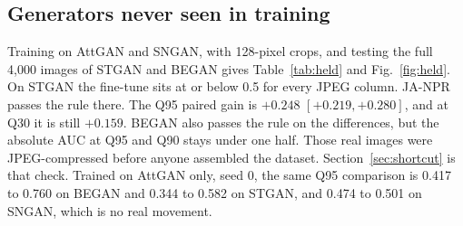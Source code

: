 \documentclass[conference]{IEEEtran}
\begin{document}
\begin{table}[t]
\centering
\caption{Ablation and controls on AttGAN (seed 0, AUC, 4:2:0). All rows: same data and protocol.
Rows come from three runs of the same seed; arms repeated across runs differ by at most 0.006.}
\label{tab:abl}
\setlength{\tabcolsep}{3pt}
\end{table}

\subsection{Generators never seen in training}
Training on AttGAN and SNGAN, with 128-pixel crops, and testing the full 4{,}000 images of STGAN and BEGAN gives Table~\ref{tab:held} and Fig.~\ref{fig:held}. On STGAN the fine-tune sits at or below 0.5 for every JPEG column. JA-NPR passes the rule there. The Q95 paired gain is $+0.248$ $[+0.219,+0.280]$, and at Q30 it is still $+0.159$. BEGAN also passes the rule on the differences, but the absolute AUC at Q95 and Q90 stays under one half. Those real images were JPEG-compressed before anyone assembled the dataset. Section~\ref{sec:shortcut} is that check. Trained on AttGAN only, seed 0, the same Q95 comparison is 0.417 to 0.760 on BEGAN and 0.344 to 0.582 on STGAN, and 0.474 to 0.501 on SNGAN, which is no real movement.
\end{document}
